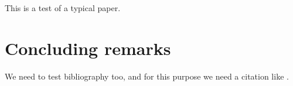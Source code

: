 \documentclass[final]{elsarticle}
\begin{document}
This is a test of a typical paper.

\section{Concluding remarks}

We need to test bibliography too, and for this purpose we need
a citation like \cite{Langtangen_1992c,Langtangen_1994a}.






\end{document}
